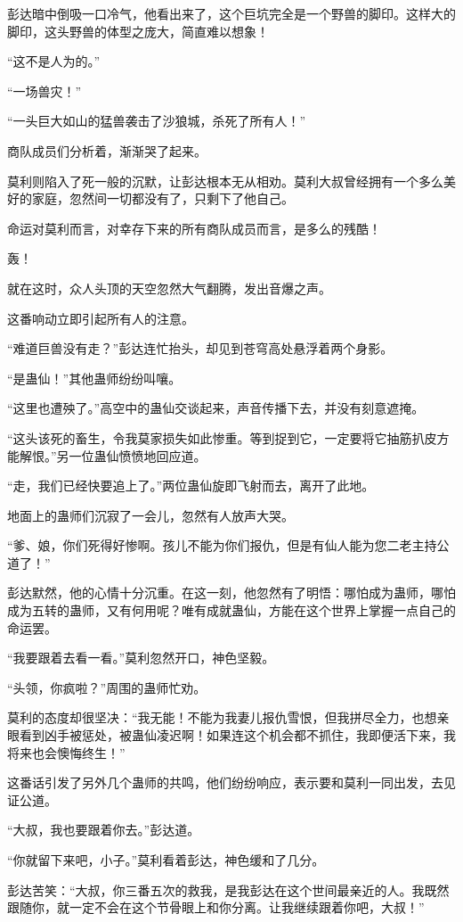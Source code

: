 \begin{this_body}
彭达暗中倒吸一口冷气，他看出来了，这个巨坑完全是一个野兽的脚印。这样大的脚印，这头野兽的体型之庞大，简直难以想象！

“这不是人为的。”

“一场兽灾！”

“一头巨大如山的猛兽袭击了沙狼城，杀死了所有人！”

商队成员们分析着，渐渐哭了起来。

莫利则陷入了死一般的沉默，让彭达根本无从相劝。莫利大叔曾经拥有一个多么美好的家庭，忽然间一切都没有了，只剩下了他自己。

命运对莫利而言，对幸存下来的所有商队成员而言，是多么的残酷！

轰！

就在这时，众人头顶的天空忽然大气翻腾，发出音爆之声。

这番响动立即引起所有人的注意。

“难道巨兽没有走？”彭达连忙抬头，却见到苍穹高处悬浮着两个身影。

“是蛊仙！”其他蛊师纷纷叫嚷。

“这里也遭殃了。”高空中的蛊仙交谈起来，声音传播下去，并没有刻意遮掩。

“这头该死的畜生，令我莫家损失如此惨重。等到捉到它，一定要将它抽筋扒皮方能解恨。”另一位蛊仙愤愤地回应道。

“走，我们已经快要追上了。”两位蛊仙旋即飞射而去，离开了此地。

地面上的蛊师们沉寂了一会儿，忽然有人放声大哭。

“爹、娘，你们死得好惨啊。孩儿不能为你们报仇，但是有仙人能为您二老主持公道了！”

彭达默然，他的心情十分沉重。在这一刻，他忽然有了明悟：哪怕成为蛊师，哪怕成为五转的蛊师，又有何用呢？唯有成就蛊仙，方能在这个世界上掌握一点自己的命运罢。

“我要跟着去看一看。”莫利忽然开口，神色坚毅。

“头领，你疯啦？”周围的蛊师忙劝。

莫利的态度却很坚决：“我无能！不能为我妻儿报仇雪恨，但我拼尽全力，也想亲眼看到凶手被惩处，被蛊仙凌迟啊！如果连这个机会都不抓住，我即便活下来，我将来也会懊悔终生！”

这番话引发了另外几个蛊师的共鸣，他们纷纷响应，表示要和莫利一同出发，去见证公道。

“大叔，我也要跟着你去。”彭达道。

“你就留下来吧，小子。”莫利看着彭达，神色缓和了几分。

彭达苦笑：“大叔，你三番五次的救我，是我彭达在这个世间最亲近的人。我既然跟随你，就一定不会在这个节骨眼上和你分离。让我继续跟着你吧，大叔！”


\end{this_body}
